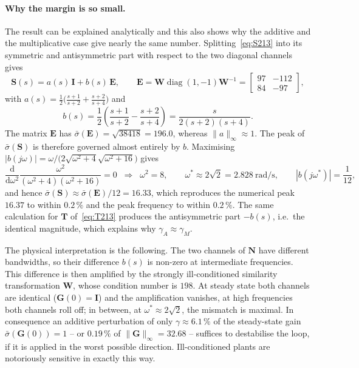 \paragraph{Why the margin is so small.} The result can be explained analytically and this also
shows why the additive and the multiplicative case give nearly the same number.
Splitting~\eqref{eq:S213} into its symmetric and antisymmetric part with respect to the two
diagonal channels gives
\begin{equation}
    \mathbf{S}(s) = a(s)\,\mathbf{I} + b(s)\,\mathbf{E},
    \qquad
    \mathbf{E} = \mathbf{W}\operatorname{diag}(1,-1)\mathbf{W}^{-1}
    = \begin{bmatrix}97&-112\\84&-97\end{bmatrix},
    \label{eq:decomposition}
\end{equation}
with $a(s)=\tfrac{1}{2}\big(\tfrac{s+1}{s+2}+\tfrac{s+2}{s+4}\big)$ and
\begin{equation}
    b(s) = \frac{1}{2}\left(\frac{s+1}{s+2}-\frac{s+2}{s+4}\right)
         = \frac{s}{2(s+2)(s+4)} .
    \label{eq:bofs}
\end{equation}
The matrix $\mathbf{E}$ has $\bar{\sigma}(\mathbf{E})=\sqrt{38418}=196.0$, whereas
$\|a\|_\infty\approx 1$. The peak of $\bar{\sigma}(\mathbf{S})$ is therefore governed almost
entirely by $b$. Maximising
$|b(j\omega)|=\omega/\big(2\sqrt{\omega^2+4}\sqrt{\omega^2+16}\big)$ gives
\begin{equation}
    \frac{\mathrm{d}}{\mathrm{d}\omega^2}
    \frac{\omega^2}{(\omega^2+4)(\omega^2+16)} = 0
    \;\;\Longrightarrow\;\;
    \omega^2 = 8,\qquad
    \omega^* \approx 2\sqrt{2} = 2.828\ \mathrm{rad/s},\qquad
    |b(j\omega^*)| = \frac{1}{12},
    \label{eq:analyticpeak}
\end{equation}
and hence $\bar{\sigma}(\mathbf{S})\approx\bar{\sigma}(\mathbf{E})/12=16.33$, which reproduces
the numerical peak $16.37$ to within $0.2\,\%$ and the peak frequency to within $0.2\,\%$. The
same calculation for $\mathbf{T}$ of~\eqref{eq:T213} produces the antisymmetric part
$-b(s)$, i.e.\ the identical magnitude, which explains why $\gamma_A\approx\gamma_M$.

The physical interpretation is the following. The two channels of $\mathbf{N}$ have different
bandwidths, so their difference $b(s)$ is non-zero at intermediate frequencies. This difference
is then amplified by the strongly ill-conditioned similarity transformation $\mathbf{W}$, whose
condition number is $198$. At steady state both channels are identical
($\mathbf{G}(0)=\mathbf{I}$) and the amplification vanishes, at high frequencies both channels
roll off; in between, at $\omega^*\approx2\sqrt{2}$, the mismatch is maximal. In consequence an
additive perturbation of only $\gamma\approx6.1\,\%$ of the steady-state gain
$\bar{\sigma}(\mathbf{G}(0))=1$ -- or $0.19\,\%$ of $\|\mathbf{G}\|_\infty=32.68$ -- suffices to
destabilise the loop, if it is applied in the worst possible direction. Ill-conditioned plants
are notoriously sensitive in exactly this way.

